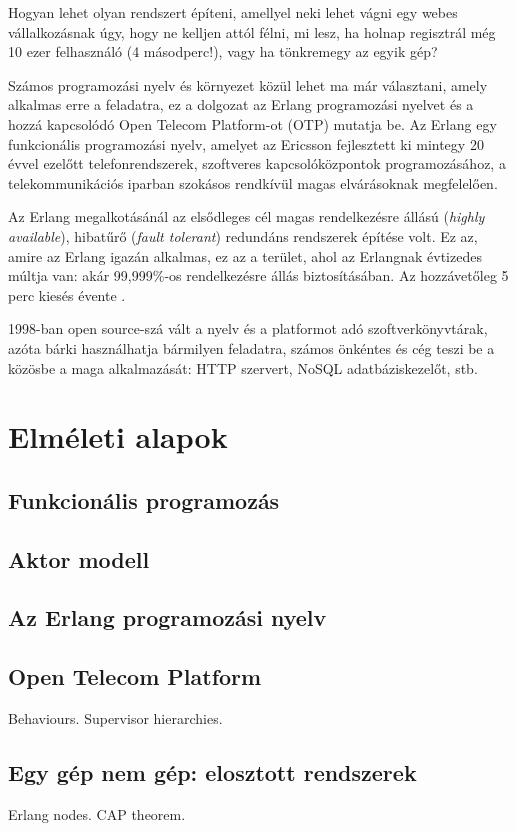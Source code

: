 \documentclass[12pt, a4paper, oneside]{book}
\begin{document}
Hogyan lehet olyan rendszert építeni, amellyel neki lehet vágni egy webes
vállalkozásnak úgy, hogy ne kelljen attól félni, mi lesz, ha holnap regisztrál
még 10 ezer felhasználó (4 másodperc!), vagy ha tönkremegy az egyik gép?

Számos programozási nyelv és környezet közül lehet ma már választani, amely
alkalmas erre a feladatra, ez a dolgozat az Erlang programozási nyelvet és a
hozzá kapcsolódó Open Telecom Platform-ot (OTP) mutatja be. Az Erlang egy
funkcionális programozási nyelv, amelyet az Ericsson fejlesztett ki mintegy 20
évvel ezelőtt telefonrendszerek, szoftveres kapcsolóközpontok programozásához,
a telekommunikációs iparban szokásos rendkívül magas elvárásoknak megfelelően. 

Az Erlang megalkotásánál az elsődleges cél magas rendelkezésre állású
(\emph{highly available}), hibatűrő (\emph{fault tolerant}) redundáns
rendszerek építése volt. Ez az, amire az Erlang igazán alkalmas, ez az a
terület, ahol az Erlangnak évtizedes múltja van: akár 99,999\%-os
rendelkezésre állás biztosításában. Az hozzávetőleg 5 perc kiesés
évente \citep{WikipediaNines}.

1998-ban open source-szá vált a nyelv és a platformot adó
szoftverkönyvtárak, azóta bárki használhatja bármilyen feladatra, számos
önkéntes és cég teszi be a közösbe a maga alkalmazását: HTTP szervert, NoSQL
adatbáziskezelőt, stb.

\newpage

\chapter{Elméleti alapok}
\section{Funkcionális programozás}
\section{Aktor modell}
\section{Az Erlang programozási nyelv}
\section{Open Telecom Platform}
Behaviours. Supervisor hierarchies.
\section{Egy gép nem gép: elosztott rendszerek}
Erlang nodes. CAP theorem.
\end{document}
